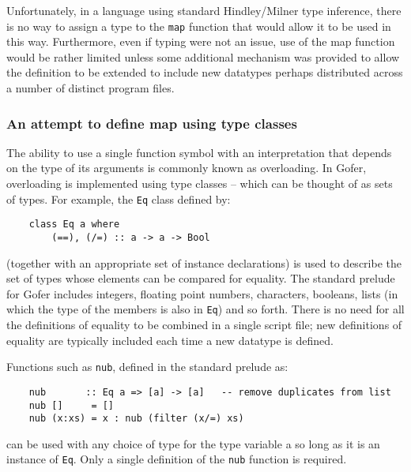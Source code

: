 Unfortunately, in a language using standard Hindley/Milner type
inference, there is no way to assign a type to the \verb"map" function that
would allow it to be used in this way.  Furthermore, even if typing
were not an issue, use of the map function would be rather limited
unless some additional mechanism was provided to allow the definition
to be extended to include new datatypes perhaps distributed across a
number of distinct program files.


\subsubsection{An attempt to define map using type classes}
The ability to use a single function symbol with an interpretation that
depends on the type of its arguments is commonly known as overloading.
In Gofer, overloading is implemented using type classes -- which can be
thought of as sets of types.  For example, the \verb"Eq" class defined by:
\begin{verbatim}
    class Eq a where
        (==), (/=) :: a -> a -> Bool
\end{verbatim}
(together with an appropriate set of instance declarations) is used to
describe the set of types whose elements can be compared for equality.
The standard prelude for Gofer includes integers, floating point
numbers, characters, booleans, lists (in which the type of the members
is also in \verb"Eq") and so forth.  There is no need for all the definitions
of equality to be combined in a single script file; new definitions of
equality are typically included each time a new datatype is defined.

Functions such as \verb"nub", defined in the standard prelude as:
\begin{verbatim}
    nub       :: Eq a => [a] -> [a]   -- remove duplicates from list
    nub []     = []
    nub (x:xs) = x : nub (filter (x/=) xs)
\end{verbatim}
can be used with any choice of type for the type variable a so long as
it is an instance of \verb"Eq".  Only a single definition of the \verb"nub" function
is required.

